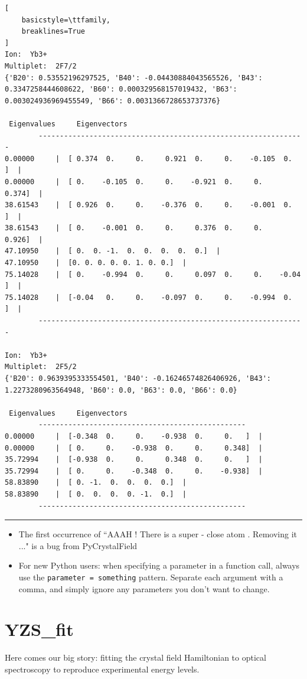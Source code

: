 \documentclass{article}
\begin{document}
\begin{lstlisting}[
    basicstyle=\ttfamily,
    breaklines=True
]
Ion:  Yb3+
Multiplet:  2F7/2
{'B20': 0.53552196297525, 'B40': -0.04430884043565526, 'B43': 0.3347258444608622, 'B60': 0.000329568157019432, 'B63': 0.003024936969455549, 'B66': 0.0031366728653737376}

 Eigenvalues 	 Eigenvectors
		---------------------------------------------------------------
0.00000 	|  [ 0.374  0.     0.     0.921  0.     0.    -0.105  0.   ]  |
0.00000 	|  [ 0.    -0.105  0.     0.    -0.921  0.     0.     0.374]  |
38.61543 	|  [ 0.926  0.     0.    -0.376  0.     0.    -0.001  0.   ]  |
38.61543 	|  [ 0.    -0.001  0.     0.     0.376  0.     0.     0.926]  |
47.10950 	|  [ 0.  0. -1.  0.  0.  0.  0.  0.]  |
47.10950 	|  [0. 0. 0. 0. 0. 1. 0. 0.]  |
75.14028 	|  [ 0.    -0.994  0.     0.     0.097  0.     0.    -0.04 ]  |
75.14028 	|  [-0.04   0.     0.    -0.097  0.     0.    -0.994  0.   ]  |
		---------------------------------------------------------------

Ion:  Yb3+
Multiplet:  2F5/2
{'B20': 0.9639395333554501, 'B40': -0.16246574826406926, 'B43': 1.2273280963564948, 'B60': 0.0, 'B63': 0.0, 'B66': 0.0}

 Eigenvalues 	 Eigenvectors
		-------------------------------------------------
0.00000 	|  [-0.348  0.     0.    -0.938  0.     0.   ]  |
0.00000 	|  [ 0.     0.    -0.938  0.     0.     0.348]  |
35.72994 	|  [-0.938  0.     0.     0.348  0.     0.   ]  |
35.72994 	|  [ 0.     0.    -0.348  0.     0.    -0.938]  |
58.83890 	|  [ 0. -1.  0.  0.  0.  0.]  |
58.83890 	|  [ 0.  0.  0.  0. -1.  0.]  |
		-------------------------------------------------
\end{lstlisting}
\hrule
\smallskip
{}
\begin{itemize}
\item The first occurrence of ``AAAH ! There is a super - close atom . Removing it ..." is a bug from PyCrystalField
\item For new Python users: when specifying a parameter in a function call, always use the \texttt{parameter = something} pattern. Separate each argument with a comma, and simply ignore any parameters you don't want to change.
\end{itemize}

\section{YZS\_fit}
Here comes our big story: fitting the crystal field Hamiltonian to optical spectroscopy to reproduce experimental energy levels.
\end{document}
